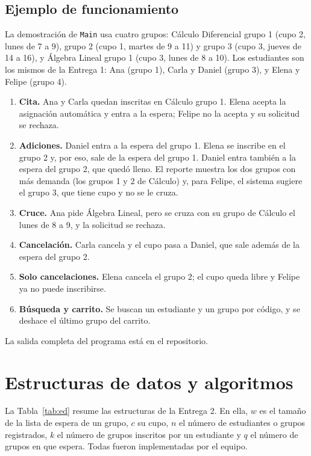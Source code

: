 \documentclass[conference]{IEEEtran}
\begin{document}
\subsection{Ejemplo de funcionamiento}
La demostración de \texttt{Main} usa cuatro grupos: Cálculo Diferencial grupo 1 (cupo 2, lunes de 7 a 9), grupo 2 (cupo 1, martes de 9 a 11) y grupo 3 (cupo 3, jueves de 14 a 16), y Álgebra Lineal grupo 1 (cupo 3, lunes de 8 a 10). Los estudiantes son los mismos de la Entrega 1: Ana (grupo 1), Carla y Daniel (grupo 3), y Elena y Felipe (grupo 4).
\begin{enumerate}
    \item \textbf{Cita.} Ana y Carla quedan inscritas en Cálculo grupo 1. Elena acepta la asignación automática y entra a la espera; Felipe no la acepta y su solicitud se rechaza.
    \item \textbf{Adiciones.} Daniel entra a la espera del grupo 1. Elena se inscribe en el grupo 2 y, por eso, sale de la espera del grupo 1. Daniel entra también a la espera del grupo 2, que quedó lleno. El reporte muestra los dos grupos con más demanda (los grupos 1 y 2 de Cálculo) y, para Felipe, el sistema sugiere el grupo 3, que tiene cupo y no se le cruza.
    \item \textbf{Cruce.} Ana pide Álgebra Lineal, pero se cruza con su grupo de Cálculo el lunes de 8 a 9, y la solicitud se rechaza.
    \item \textbf{Cancelación.} Carla cancela y el cupo pasa a Daniel, que sale además de la espera del grupo 2.
    \item \textbf{Solo cancelaciones.} Elena cancela el grupo 2; el cupo queda libre y Felipe ya no puede inscribirse.
    \item \textbf{Búsqueda y carrito.} Se buscan un estudiante y un grupo por código, y se deshace el último grupo del carrito.
\end{enumerate}
La salida completa del programa está en el repositorio.


\section{Estructuras de datos y algoritmos}

La Tabla~\ref{tab:ed} resume las estructuras de la Entrega 2. En ella, $w$ es el tamaño de la lista de espera de un grupo, $c$ su cupo, $n$ el número de estudiantes o grupos registrados, $k$ el número de grupos inscritos por un estudiante y $q$ el número de grupos en que espera. Todas fueron implementadas por el equipo.
\end{document}

